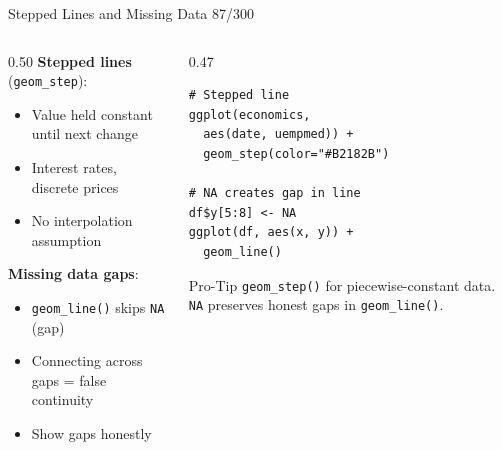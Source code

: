 \documentclass[10pt]{beamer}
\newcommand{\smark}[1]{\hfill{\scriptsize\color{codegray}#1}}
\begin{document}
\begin{frame}[fragile]{Stepped Lines and Missing Data}
\smark{87/300}
\begin{columns}[T]
\begin{column}{0.50\textwidth}
\textbf{Stepped lines} (\texttt{geom\_step}):
\begin{itemize}
    \item Value held constant until next change
    \item Interest rates, discrete prices
    \item No interpolation assumption
\end{itemize}
\vspace{0.2cm}
\textbf{Missing data gaps}:
\begin{itemize}
    \item \texttt{geom\_line()} skips \texttt{NA} (gap)
    \item Connecting across gaps = false continuity
    \item Show gaps honestly
\end{itemize}
\end{column}
\begin{column}{0.47\textwidth}
\begin{lstlisting}[style=Rstyle]
# Stepped line
ggplot(economics,
  aes(date, uempmed)) +
  geom_step(color="#B2182B")

# NA creates gap in line
df$y[5:8] <- NA
ggplot(df, aes(x, y)) +
  geom_line()
\end{lstlisting}
\begin{alertblock}{Pro-Tip}
    \scriptsize \texttt{geom\_step()} for piecewise-constant data. \texttt{NA} preserves honest gaps in \texttt{geom\_line()}.
\end{alertblock}
\end{column}
\end{columns}
\end{frame}
\end{document}
